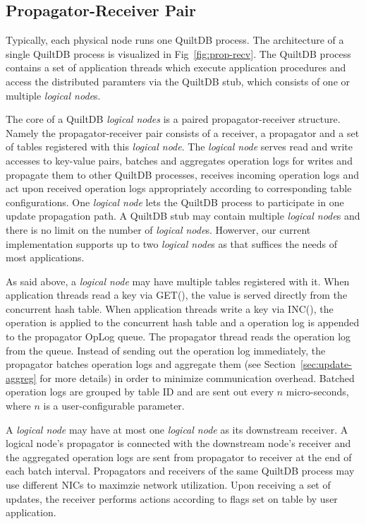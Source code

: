 \documentclass[11pt, twocolumn]{article}
\begin{document}
\subsection{Propagator-Receiver Pair}

Typically, each physical node runs one QuiltDB process. The architecture of a single
QuiltDB process is visualized in Fig~\ref{fig:prop-recv}.  The QuiltDB process
contains a set of application threads which execute application procedures and
access the distributed paramters via the QuiltDB stub, which consists of one
or multiple \emph{logical node}s.

The core of a QuiltDB \emph{logical nodes} is a paired propagator-receiver
structure. Namely the propagator-receiver pair consists
of a receiver, a propagator and a set of tables registered with this
\emph{logical node}. The \emph{logical node} serves read and write accesses to
key-value pairs, batches and aggregates operation logs for writes and propagate
them to other QuiltDB processes, receives incoming operation logs and act upon
received operation logs appropriately according to corresponding table
configurations. One \emph{logical node} lets the QuiltDB process to participate
in one update propagation path. A QuiltDB stub may contain multiple
\emph{logical node}s and there is no limit on the number of \emph{logical
node}s. Howerver, our current implementation supports up to two \emph{logical
node}s as that suffices the needs of most applications.

As said above, a \emph{logical node} may have multiple tables registered with it.
When application threads read a key via GET(), the value is served directly from
the concurrent hash table. When application threads write a key via INC(), the
operation is applied to the concurrent hash table and a operation log is
appended to the propagator OpLog queue. The propagator thread reads the
operation log from the queue. Instead of sending out the operation log
immediately, the propagator batches operation logs and aggregate them (see
Section~\ref{sec:update-aggreg} for more details) in order to minimize
communication overhead. Batched operation logs are grouped by table ID and are
sent out every $n$ micro-seconds, where $n$ is a user-configurable parameter.

A \emph{logical node} may have at most one \emph{logical node} as its downstream
receiver. A logical node's propagator is connected with the downstream node's
receiver and the aggregated operation logs are sent from propagator to receiver
at the end of each batch interval. Propagators and receivers of the same QuiltDB
process may use different NICs to maximzie network utilization. Upon receiving
a set of updates, the receiver performs actions according to flags set on table
by user application.
\end{document}
